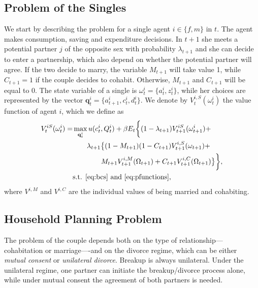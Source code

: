 \documentclass[12pt]{article}
\numberwithin{table}{section}
\begin{document}
\subsection{Problem of the Singles}
We start by describing the problem for a single agent $i\in\{f,m\}$ in $t$. The agent makes consumption, saving and expenditure decisions. In $t+1$ she meets a potential partner $j$ of the opposite sex with probability $\lambda_{t+1}$ and she can decide to enter a partnership, which also depend on whether the potential partner will agree. If the two decide to marry, the variable $M_{t+1}$ will take value 1, while $C_{t+1}=1$ if the couple decides to cohabit. Otherwise, $M_{t+1}$ and $C_{t+1}$ will be equal to 0. The state variable of a single is $\omega^i_t=\{a^i_t,z^i_t\}$, while her choices are represented by the vector $\mathbf{q}^i_t=\{a^i_{t+1},c^i_t,d^i_t\}$. We denote by $V_t^{i,S}(\omega^i_t)$ the value function of agent $i$, which we define as
\begin{equation}\label{eq:v_single}
\begin{split}
V_t^{iS}(\omega^i_t)=&\max_{\mathbf{q}^i_t} u(c^i_t,Q^i_t)+\beta E_t \bigg\{(1-\lambda_{t+1})V^{iS}_{t+1}(\omega^i_{t+1})+\\ & \quad\quad \lambda_{t+1}\big\{(1-M_{t+1})(1-C_{t+1})	V^{i,S}_{t+1}(\omega_{t+1})+\\ &\quad\quad\quad\quad M_{t+1} V^{i,M}_{t+1}(\Omega_{t+1})+ C_{t+1} V^{i,C}_{t+1}(\Omega_{t+1}) \big\}\bigg\},
\\ &\text{s.t. \eqref{eq:bcs} and \eqref{eq:pfunctions},} 
\end{split}
\end{equation}
where $V^{i,M}$ and $V^{i,C}$ are the individual values of being married and cohabiting.

\subsection{Household Planning Problem}
The problem of the couple depends both on the type of relationship---cohabitation or marriage----and on the divorce regime, which can be either \textit{mutual consent} or \textit{unilateral divorce}. Breakup is always unilateral. Under the unilateral regime, one partner can initiate the breakup/divorce process alone, while under mutual consent the agreement of both partners is needed.
\end{document}
